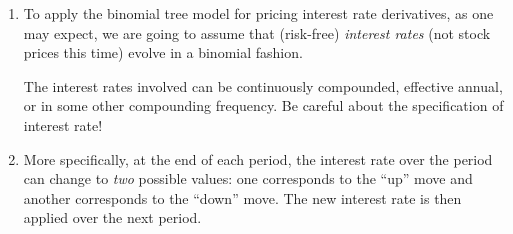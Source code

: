 \begin{enumerate}
\item To apply the binomial tree model for pricing interest rate derivatives,
as one may expect, we are going to assume that (risk-free) \emph{interest
rates} (not stock prices this time) evolve in a binomial fashion. \begin{note}
The interest rates involved can be continuously compounded, effective annual,
or in some other compounding frequency. Be careful about the specification of
interest rate!
\end{note}

\item More specifically, at the end of each period, the interest rate over the
period can change to \emph{two} possible values: one corresponds to the ``up''
move and another corresponds to the ``down'' move. The new interest rate is
then applied over the next period.


\end{enumerate}

